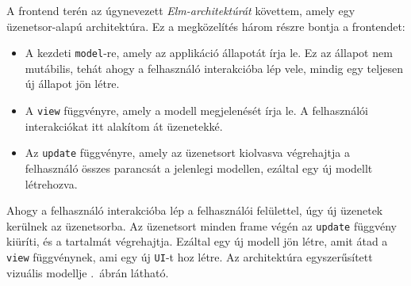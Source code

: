 \documentclass[a4paper,oneside]{article}
\begin{document}
A frontend terén az úgynevezett \emph{Elm-architektúrát} követtem, amely egy üzenetsor-alapú architektúra. Ez a megközelítés három részre bontja a frontendet:
\begin{itemize}
  \item A kezdeti \texttt{model}-re, amely az applikáció állapotát írja le. Ez az állapot nem mutábilis, tehát ahogy a felhasználó interakcióba lép vele, mindig egy teljesen új állapot jön létre.
  \item A \texttt{view} függvényre, amely a modell megjelenését írja le. A felhasználói interakciókat itt alakítom át üzenetekké.
  \item Az \texttt{update} függvényre, amely az üzenetsort kiolvasva végrehajtja a felhasználó összes parancsát a jelenlegi modellen, ezáltal egy új modellt létrehozva.
\end{itemize}
Ahogy a felhasználó interakcióba lép a felhasználói felülettel, úgy új üzenetek kerülnek az üzenetsorba. Az üzenetsort minden frame végén az \texttt{update} függvény kiüríti, és a tartalmát végrehajtja. Ezáltal egy új modell jön létre, amit átad a \texttt{view} függvénynek, ami egy új \texttt{UI}-t hoz létre. Az architektúra egyszerűsített vizuális modellje .~ábrán látható.
\end{document}
